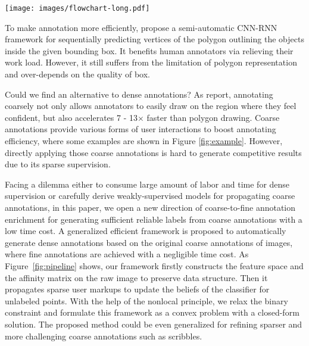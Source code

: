 \documentclass[sigconf]{acmart}
\begin{document}
\begin{figure*}[!htb]
	\centering
	\texttt{[image: images/flowchart-long.pdf]}
	\caption{The proposed framework. The blue blocks show the offline components and the yellow ones present online processing. Each time when coarse annotations come along, markups are viewed as binary constraint that helps to update the prediction of unlabeled pixels.
	}%
	\label{fig:pipeline}
\end{figure*}


To make annotation more efficiently, \cite{polyrnn,polyrnn1} propose a semi-automatic CNN-RNN framework for sequentially predicting vertices of the polygon outlining the objects inside the given bounding box. It benefits human annotators via relieving their work load. However, it still suffers from the limitation of polygon representation and over-depends on the quality of box.

Could we find an alternative to dense annotations? As \cite{point,cityscapes} report, annotating coarsely not only allows annotators to easily draw on the region where they feel confident, but also accelerates 7 - 13$\times$ faster than polygon drawing. Coarse annotations provide various forms of user interactions to boost annotating efficiency, where some examples are shown in Figure \ref{fig:example}. However, directly applying those coarse annotations is hard to generate competitive results due to its sparse supervision. 

Facing a dilemma either to consume large amount of labor and time for dense supervision or carefully derive weakly-supervised models for propagating coarse annotations, in this paper, we open a new direction of coarse-to-fine annotation enrichment for generating sufficient reliable labels from coarse annotations with a low time cost. A generalized efficient framework is proposed to automatically generate dense annotations based on the original coarse annotations of images, where fine annotations are achieved with a negligible time cost. As Figure~\ref{fig:pipeline} shows, our framework firstly constructs the feature space and the affinity matrix on the raw image to preserve data structure. Then it propagates sparse user markups to update the beliefs of the classifier for unlabeled points. With the help of the nonlocal principle, we relax the binary constraint and formulate this framework as a convex problem with a closed-form solution. The proposed method could be even generalized for refining sparser and more challenging coarse annotations such as scribbles.
\end{document}

